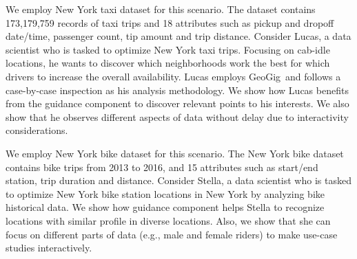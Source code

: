\documentclass[conference]{IEEEtran}
\newcommand{\sys}{{\sc GeoGig}}
\newcommand{\framework}{{\sc GeoHighlight}}
\begin{document}
 We employ New York taxi dataset for this scenario. The  dataset contains 173,179,759 records of taxi trips and 18 attributes such as pickup and dropoff date/time, passenger count, tip amount and trip distance. Consider Lucas, a data scientist who is tasked to optimize New York taxi trips. Focusing on cab-idle locations, he wants to discover which neighborhoods work the best for which drivers to increase the overall availability. Lucas employs \sys\ and follows a case-by-case inspection as his analysis methodology. We show how Lucas benefits from the guidance component to discover relevant points to his interests. We also show that he observes different aspects of data without delay due to interactivity considerations.

 We employ New York bike dataset for this scenario. The New York bike dataset contains bike trips from 2013 to 2016, and 15 attributes such as start/end station, trip duration and distance. Consider Stella, a data scientist who is tasked to optimize New York bike station locations in New York by analyzing bike historical data. We show how guidance component helps Stella to recognize locations with similar profile in diverse locations. Also, we show that she can focus on different parts of data (e.g., male and female riders) to make use-case studies interactively.




 
 

 
 

\vspace{-5pt}






\end{document}
